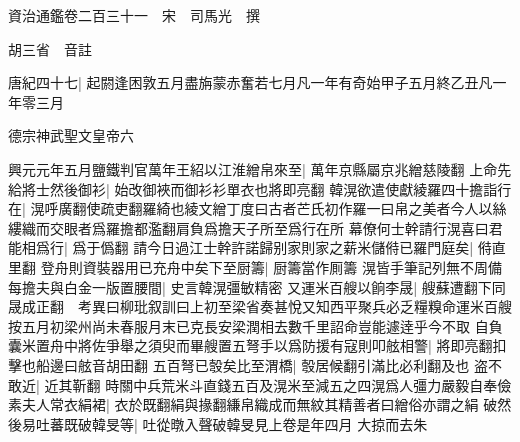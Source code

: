 






























































資治通鑑卷二百三十一　宋　司馬光　撰

胡三省　音註

唐紀四十七|{
	起閼逢困敦五月盡旃蒙赤奮若七月凡一年有奇始甲子五月終乙丑凡一年零三月}


德宗神武聖文皇帝六

興元元年五月鹽鐵判官萬年王紹以江淮繒帛來至|{
	萬年京縣屬京兆繒慈陵翻}
上命先給將士然後御衫|{
	始改御裌而御衫衫單衣也將即亮翻}
韓滉欲遣使獻綾羅四十擔詣行在|{
	滉呼廣翻使疏吏翻羅綺也綾文繒丁度曰古者芒氏初作羅一曰帛之美者今人以絲縷織而交眼者爲羅擔都濫翻肩負爲擔天子所至爲行在所}
幕僚何士幹請行滉喜曰君能相爲行|{
	爲于僞翻}
請今日過江士幹許諾歸别家則家之薪米儲偫已羅門庭矣|{
	偫直里翻}
登舟則資裝器用已充舟中矣下至厨籌|{
	厨籌當作厠籌}
滉皆手筆記列無不周備每擔夫與白金一版置腰間|{
	史言韓滉彊敏精密}
又運米百艘以餉李晟|{
	艘蘇遭翻下同晟成正翻　考異曰柳玭叙訓曰上初至梁省奏甚悅又知西平聚兵必乏糧糗命運米百艘按五月初梁州尚未春服月末已克長安梁潤相去數千里詔命豈能遽逹乎今不取}
自負囊米置舟中將佐爭舉之須臾而畢艘置五弩手以爲防援有寇則叩舷相警|{
	將即亮翻扣擊也船邊曰舷音胡田翻}
五百弩已彀矣比至渭橋|{
	彀居候翻引滿比必利翻及也}
盗不敢近|{
	近其靳翻}
時關中兵荒米斗直錢五百及滉米至減五之四滉爲人彊力嚴毅自奉儉素夫人常衣絹裙|{
	衣於既翻絹與掾翻縑帛織成而無紋其精善者曰繒俗亦謂之絹}
破然後易吐蕃既破韓旻等|{
	吐從暾入聲破韓旻見上卷是年四月}
大掠而去朱

